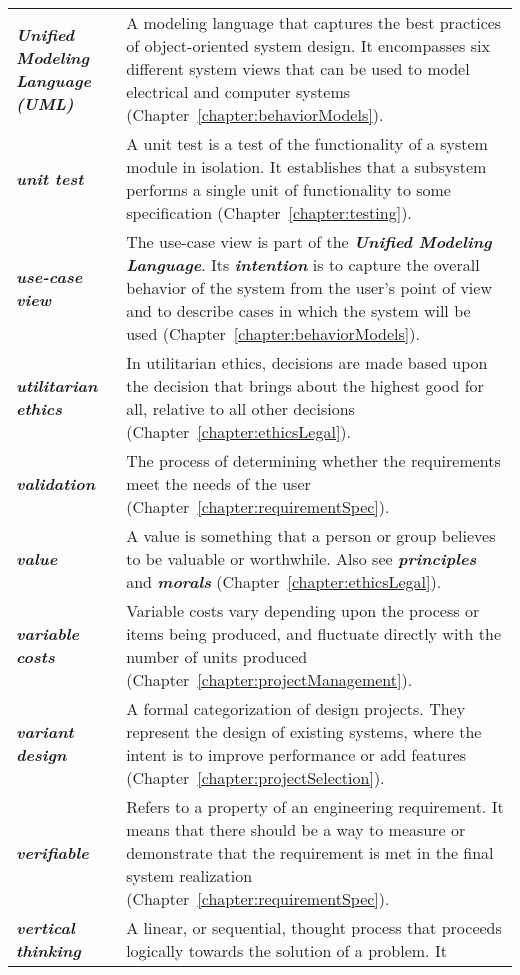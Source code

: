 \begin{longtable} { p{3cm} p{11cm}}
\emph{\textbf{Unified Modeling Language (UML)}} & A modeling language
that captures the best practices of object-oriented system design. It
encompasses six different system views that can be used to model
electrical and computer systems (Chapter~\ref{chapter:behaviorModels}). \B \\
\emph{\textbf{unit test}} & A unit test is a test of the functionality
of a system module in isolation. It establishes that a subsystem
performs a single unit of functionality to some specification 
(Chapter~\ref{chapter:testing}). \B \\
\emph{\textbf{use-case view}} & The use-case view is part of the
\emph{\textbf{Unified Modeling Language}}. Its \emph{\textbf{intention}}
is to capture the overall behavior of the system from the user's point
of view and to describe cases in which the system will be used 
(Chapter~\ref{chapter:behaviorModels}). \B \\
\emph{\textbf{utilitarian ethics}} & In utilitarian ethics, decisions
are made based upon the decision that brings about the highest good for
all, relative to all other decisions (Chapter~\ref{chapter:ethicsLegal}). \B \\
\emph{\textbf{validation}} & The process of determining whether the
requirements meet the needs of the user (Chapter~\ref{chapter:requirementSpec}). \B \\
\emph{\textbf{value}} & A value is something that a person or group
believes to be valuable or worthwhile. Also see
\emph{\textbf{principles}} and \emph{\textbf{morals}} (Chapter~\ref{chapter:ethicsLegal}). \B \\
\emph{\textbf{variable costs}} & Variable costs vary depending upon the
process or items being produced, and fluctuate directly with the number
of units produced (Chapter~\ref{chapter:projectManagement}). \B \\
\emph{\textbf{variant design}} & A formal categorization of design
projects. They represent the design of existing systems, where the
intent is to improve performance or add features (Chapter~\ref{chapter:projectSelection}). \B \\
\emph{\textbf{verifiable}} & Refers to a property of an engineering
requirement. It means that there should be a way to measure or
demonstrate that the requirement is met in the final system realization
(Chapter~\ref{chapter:requirementSpec}). \B \\
\emph{\textbf{vertical thinking}} & A linear, or sequential, thought
process that proceeds logically towards the solution of a problem. It

\end{longtable}
